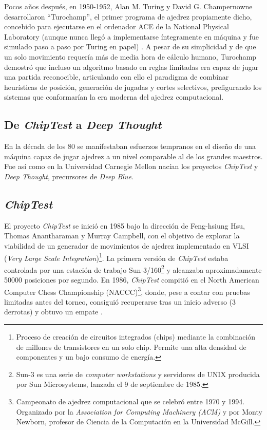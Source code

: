 \documentclass[a4paper, 12pt]{article}
\begin{document}
Pocos años después, en 1950-1952, Alan M. Turing y David G. 
Champernowne desarrollaron “Turochamp”, el primer programa de 
ajedrez propiamente dicho, concebido para ejecutarse en el 
ordenador ACE de la National Physical Laboratory (aunque nunca 
llegó a implementarse íntegramente en máquina y fue simulado 
paso a paso por Turing en papel) \cite{turing1953digital}. A pesar de 
su simplicidad y de que un solo movimiento requería más de media 
hora de cálculo humano, Turochamp demostró que incluso un 
algoritmo basado en reglas limitadas era capaz de jugar una 
partida reconocible, articulando con ello el paradigma de 
combinar heurísticas de posición, generación de jugadas y 
cortes selectivos, prefigurando los sistemas que conformarían la 
era moderna del ajedrez computacional.

\subsection{De \emph{ChipTest} a \emph{Deep Thought}}

En la década de los 80 se manifestaban esfuerzos tempranos en 
el diseño de una máquina capaz de jugar ajedrez a un nivel comparable
al de los grandes maestros. Fue así como en la Universidad 
Carnegie Mellon nacían los proyectos \emph{ChipTest} y \emph{Deep Thought},
precursores de \textit{Deep Blue}.


\subsection{\emph{ChipTest}}
El proyecto \emph{ChipTest} se inició en 1985 bajo la dirección de 
Feng-hsiung Hsu, Thomas 
Anantharaman y Murray Campbell, con el objetivo de explorar la 
viabilidad de un generador de movimientos de ajedrez 
implementado en VLSI (\emph{Very Large Scale Integration})\footnote{Proceso de creación de circuitos integrados (chips) mediante la combinación de millones de transistores en un solo chip. Permite una alta densidad de componentes y un bajo consumo de energía.}. 
La primera versión de 
\emph{ChipTest} estaba controlada por una estación de trabajo 
Sun-3/160\footnote{Sun-3 es una serie de \emph{computer workstations} y servidores de UNIX producida por Sun Microsystems, lanzada el 9 de septiembre de 1985.} 
y alcanzaba aproximadamente 50000 posiciones por 
segundo. En 1986, \emph{ChipTest} compitió en el North 
American Computer Chess Championship (NACCC)\footnote{Campeonato 
de ajedrez computacional que se celebró entre 1970 y 1994. 
Organizado por la \emph{Association for Computing Machinery (ACM)} y por Monty Newborn, profesor de 
Ciencia de la Computación en la Universidad McGill.}, 
donde, pese a contar con 
pruebas limitadas antes del torneo, consiguió recuperarse tras 
un inicio adverso (3 derrotas) y obtuvo un empate 
\cite{hsu1990deep}.
\end{document}

